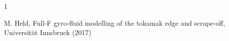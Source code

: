 \documentclass{hitec} %
\renewenvironment{thebibliography}[1]{
  \begin{oldthebibliography}{#1}
    \RaggedRight %
    \setlength{\itemsep}{0em}
    \setlength{\parskip}{0em}
}
{
  \end{oldthebibliography}
}
\begin{document}
\begin{thebibliography}{1}
  M. Held, Full-F gyro-fluid modelling of the tokamak edge and scrape-off, Universit{\"a}t Innsbruck (2017)
\end{thebibliography}
\end{document}
